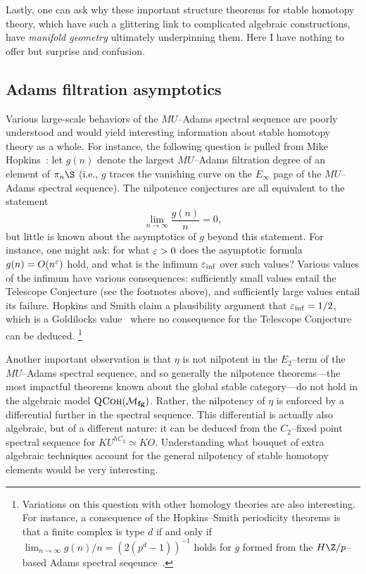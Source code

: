 Lastly, one can ask why these important structure theorems for stable homotopy theory, which have such a glittering link to complicated algebraic constructions, have \emph{manifold geometry} ultimately underpinning them.
Here I have nothing to offer but surprise and confusion.








\subsection*{Adams filtration asymptotics}

Various large-scale behaviors of the \(MU\)--Adams spectral sequence are poorly understood and would yield interesting information about stable homotopy theory as a whole.
For instance, the following question is pulled from Mike Hopkins~\cite[Section 10]{HopkinsOnRavenel}: let \(g(n)\) denote the largest \(MU\)--Adams filtration degree of an element of \(\pi_n \S\) (i.e., \(g\) traces the vanishing curve on the \(E_\infty\) page of the \(MU\)--Adams spectral sequence).
The nilpotence conjectures are all equivalent to the statement \[\lim_{n \to \infty} \frac{g(n)}{n} = 0,\] but little is known about the asymptotics of \(g\) beyond this statement.
For instance, one might ask: for what \(\varepsilon > 0\) does the asymptotic formula \(g(n) = O(n^{\varepsilon})\) hold, and what is the infimum \(\varepsilon_{\inf}\) over such values?
Various values of the infimum have various consequences: sufficiently small values entail the Telescope Conjecture (see the footnotes above), and sufficiently large values entail its failure.
Hopkins and Smith claim a plausibility argument that \(\varepsilon_{\inf} = 1/2\), which is a Goldilocks value~\cite{Dicke} where no consequence for the Telescope Conjecture can be deduced.%
\footnote{%
Variations on this question with other homology theories are also interesting.
For instance, a consequence of the Hopkins--Smith periodicity theorems is that a finite complex is type \(d\) if and only if \(\lim_{n \to \infty} g(n) / n = (2(p^d-1))^{-1}\) holds for \(g\) formed from the \(H\Z/p\)--based Adams spectral seqeunce~\cite[Section 3.5]{HopkinsICMZurich}.
}

Another important observation is that \(\eta\) is not nilpotent in the \(E_2\)--term of the \(MU\)--Adams spectral sequence, and so generally the nilpotence theorems---the most impactful theorems known about the global stable category---do not hold in the algebraic model \(\normalfont\textsc{QCoh}(\mathcal{M}_{\mathbf{fg}})\).
Rather, the nilpotency of \(\eta\) is enforced by a differential further in the spectral sequence.
This differential is actually also algebraic, but of a different nature: it can be deduced from the \(C_2\)--fixed point spectral sequence for \(KU^{hC_2} \simeq KO\).
Understanding what bouquet of extra algebraic techniques account for the general nilpotency of stable homotopy elements would be very interesting.

